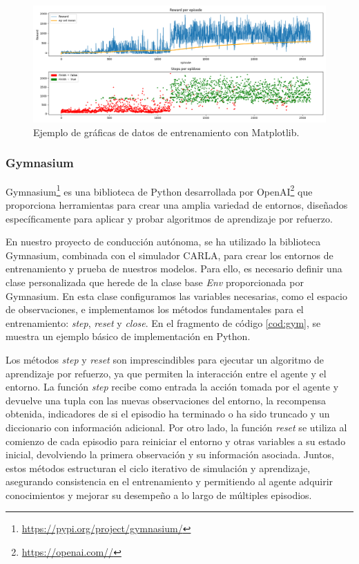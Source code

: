 \begin{figure}[ht]
  \begin{center}
    \includegraphics[width=12cm]{figs/Plataformas_Desarollo/plot.png}
  \end{center}
  \caption{Ejemplo de gráficas de datos de entrenamiento con Matplotlib.}
  \label{foto_plot}
\end{figure}

\subsubsection{Gymnasium}
\label{sec:gymnasium}

Gymnasium\footnote{\url{https://pypi.org/project/gymnasium/}} es una biblioteca de Python desarrollada por OpenAI\footnote{\url{https://openai.com//}} que proporciona herramientas para crear una amplia variedad de entornos, diseñados específicamente para aplicar y probar algoritmos de aprendizaje por refuerzo.

En nuestro proyecto de conducción autónoma, se ha utilizado la biblioteca Gymnasium, combinada con el simulador CARLA, para crear los entornos de entrenamiento y prueba de nuestros modelos. Para ello, es necesario definir una clase personalizada que herede de la clase base \textit{Env} proporcionada por Gymnasium. En esta clase configuramos las variables necesarias, como el espacio de observaciones, e implementamos los métodos fundamentales para el entrenamiento: \textit{step}, \textit{reset} y \textit{close}. En el fragmento de código \ref{cod:gym}, se muestra un ejemplo básico de implementación en Python.

Los métodos \textit{step} y \textit{reset} son imprescindibles para ejecutar un algoritmo de aprendizaje por refuerzo, ya que permiten la interacción entre el agente y el entorno. La función \textit{step} recibe como entrada la acción tomada por el agente y devuelve una tupla con las nuevas observaciones del entorno, la recompensa obtenida, indicadores de si el episodio ha terminado o ha sido truncado y un diccionario con información adicional. Por otro lado, la función \textit{reset} se utiliza al comienzo de cada episodio para reiniciar el entorno y otras variables a su estado inicial, devolviendo la primera observación y su información asociada. Juntos, estos métodos estructuran el ciclo iterativo de simulación y aprendizaje, asegurando consistencia en el entrenamiento y permitiendo al agente adquirir conocimientos y mejorar su desempeño a lo largo de múltiples episodios.

